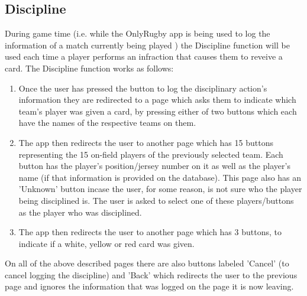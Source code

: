 \subsection{Discipline}
		During game time (i.e. while the OnlyRugby app is being used to log the information of a match currently being played ) 
		the Discipline function will be used each time a player performs an infraction that causes them to reveive a card.
		The Discipline function works as follows:
		\begin{enumerate}
			\item Once the user has pressed the button to log the disciplinary action's information they are redirected to a page which asks them to indicate which team's player was given a card, by pressing either of two buttons which each
			have the names of the respective teams on them.
			\item The app then redirects the user to another page which has 15 buttons representing the 15 on-field players of the previously selected team. Each button has the player's position/jersey number on it 
			as well as the player's name (if that information is provided on the database). This page also has an 'Unknown' button incase the user, for some reason, is not sure who the player being disciplined is. The user is asked to select one of these players/buttons as the player who was disciplined.
			\item The app then redirects the user to another page which has 3 buttons, to indicate if a white, yellow or red card was given.
			
		\end{enumerate}
	On all of the above described pages there are also buttons labeled 'Cancel' (to cancel logging the discipline) and 'Back' which redirects the user to the previous page and ignores the information that was logged on the page it is now leaving.